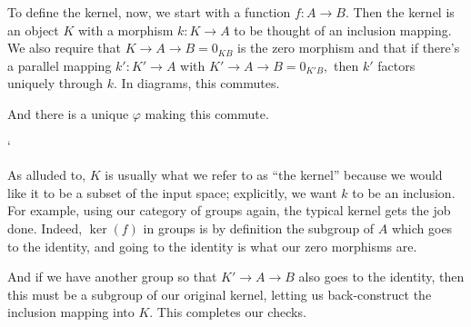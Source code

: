 To define the kernel, now, we start with a function $f:A\to B.$ Then the kernel is an object $K$ with a morphism $k:K\to A$ to be thought of an inclusion mapping. We also require that $K\to A\to B=0_{KB}$ is the zero morphism and that if there's a parallel mapping $k':K'\to A$ with $K'\to A\to B=0_{K'B},$ then $k'$ factors uniquely through $k.$ In diagrams, this commutes.
\begin{center}
\end{center}
And there is a unique $\varphi$ making this commute.
\begin{center}`
\end{center}
As alluded to, $K$ is usually what we refer to as ``the kernel'' because we would like it to be a subset of the input space; explicitly, we want $k$ to be an inclusion. For example, using our category of groups again, the typical kernel gets the job done. Indeed, $\ker(f)$ in groups is by definition the subgroup of $A$ which goes to the identity, and going to the identity is what our zero morphisms are.

And if we have another group so that $K'\to A\to B$ also goes to the identity, then this must be a subgroup of our original kernel, letting us back-construct the inclusion mapping into $K.$ This completes our checks.

